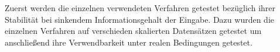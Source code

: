 Zuerst werden die einzelnen verwendeten Verfahren getestet bezüglich ihrer Stabilität bei sinkendem Informationsgehalt der Eingabe. Dazu wurden die einzelnen Verfahren auf verschieden skalierten Datensätzen getestet um anschließend ihre Verwendbarkeit unter realen Bedingungen getestet.